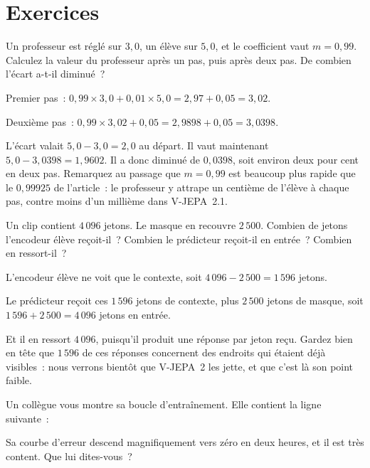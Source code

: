 \section*{Exercices}

\begin{exercice}
Un professeur est réglé sur $3{,}0$, un élève sur $5{,}0$, et le coefficient
vaut $m = 0{,}99$. Calculez la valeur du professeur après un pas, puis après
deux pas. De combien l'écart a-t-il diminué~?
\end{exercice}

\begin{solution}
Premier pas~: $0{,}99 \times 3{,}0 + 0{,}01 \times 5{,}0 = 2{,}97 + 0{,}05
= 3{,}02$.

Deuxième pas~: $0{,}99 \times 3{,}02 + 0{,}05 = 2{,}9898 + 0{,}05 =
3{,}0398$.

L'écart valait $5{,}0 - 3{,}0 = 2{,}0$ au départ. Il vaut maintenant
$5{,}0 - 3{,}0398 = 1{,}9602$. Il a donc diminué de $0{,}0398$, soit environ
deux pour cent en deux pas. Remarquez au passage que $m = 0{,}99$ est
beaucoup plus rapide que le $0{,}99925$ de l'article~: le professeur y
attrape un centième de l'élève à chaque pas, contre moins d'un millième dans
V-JEPA~2.1.
\end{solution}

\begin{exercice}
Un clip contient $4\,096$ jetons. Le masque en recouvre $2\,500$. Combien de
jetons l'encodeur élève reçoit-il~? Combien le prédicteur reçoit-il en
entrée~? Combien en ressort-il~?
\end{exercice}

\begin{solution}
L'encodeur élève ne voit que le contexte, soit $4\,096 - 2\,500 = 1\,596$
jetons.

Le prédicteur reçoit ces $1\,596$ jetons de contexte, plus $2\,500$ jetons
de masque, soit $1\,596 + 2\,500 = 4\,096$ jetons en entrée.

Et il en ressort $4\,096$, puisqu'il produit une réponse par jeton reçu.
Gardez bien en tête que $1\,596$ de ces réponses concernent des endroits qui
étaient déjà visibles~: nous verrons bientôt que V-JEPA~2 les jette, et que
c'est là son point faible.
\end{solution}

\begin{exercice}
Un collègue vous montre sa boucle d'entraînement. Elle contient la ligne
suivante~:

\begin{center}
\end{center}

Sa courbe d'erreur descend magnifiquement vers zéro en deux heures, et il
est très content. Que lui dites-vous~?
\end{exercice}

